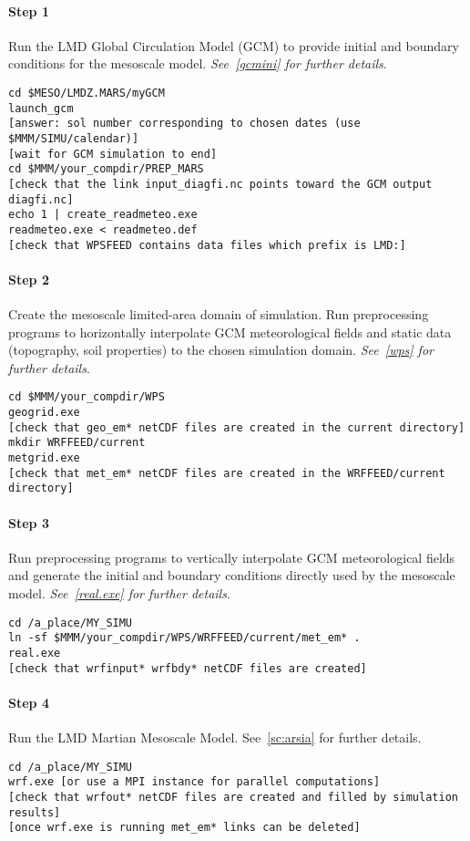 \sk
\paragraph{Step 1} Run the LMD Global Circulation Model (GCM) to provide initial and boundary conditions for the mesoscale model. \emph{See~\ref{gcmini} for further details}.
\begin{verbatim}
cd $MESO/LMDZ.MARS/myGCM
launch_gcm
[answer: sol number corresponding to chosen dates (use $MMM/SIMU/calendar)]
[wait for GCM simulation to end]
cd $MMM/your_compdir/PREP_MARS
[check that the link input_diagfi.nc points toward the GCM output diagfi.nc]
echo 1 | create_readmeteo.exe
readmeteo.exe < readmeteo.def
[check that WPSFEED contains data files which prefix is LMD:]
\end{verbatim}

\sk
\paragraph{Step 2} Create the mesoscale limited-area domain of simulation. Run preprocessing programs to horizontally interpolate GCM meteorological fields and static data (topography, soil properties) to the chosen simulation domain. \emph{See~\ref{wps} for further details}.
\begin{verbatim}
cd $MMM/your_compdir/WPS
geogrid.exe
[check that geo_em* netCDF files are created in the current directory]
mkdir WRFFEED/current
metgrid.exe
[check that met_em* netCDF files are created in the WRFFEED/current directory]
\end{verbatim}

\sk
\paragraph{Step 3} Run preprocessing programs to vertically interpolate GCM meteorological fields and generate the initial and boundary conditions directly used by the mesoscale model. \emph{See~\ref{real.exe} for further details}.
\begin{verbatim}
cd /a_place/MY_SIMU
ln -sf $MMM/your_compdir/WPS/WRFFEED/current/met_em* .
real.exe
[check that wrfinput* wrfbdy* netCDF files are created]
\end{verbatim}

\sk
\paragraph{Step 4} Run the LMD Martian Mesoscale Model. See~\ref{sc:arsia} for further details.
\begin{verbatim}
cd /a_place/MY_SIMU
wrf.exe [or use a MPI instance for parallel computations]
[check that wrfout* netCDF files are created and filled by simulation results]
[once wrf.exe is running met_em* links can be deleted]
\end{verbatim}

